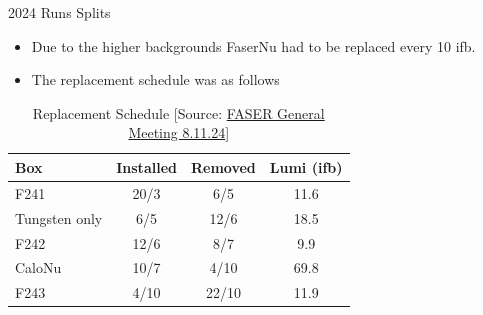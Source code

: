 
\begin{frame}{2024 Runs Splits}
    \begin{itemize}
        \item Due to the higher backgrounds FaserNu had to be replaced every 10 ifb.
        \item The replacement schedule was as follows
    \end{itemize}
    \begin{table}[h!]
        \begin{tabular}{|l|c|c|c|}
            \hline
            \textbf{Box}  & \textbf{Installed} & \textbf{Removed} & \textbf{Lumi (ifb)} \\ \hline
            F241          & 20/3               & 6/5              & 11.6                \\ \hline
            Tungsten only & 6/5                & 12/6             & 18.5                \\ \hline
            F242          & 12/6               & 8/7              & 9.9                 \\ \hline
            CaloNu        & 10/7               & 4/10             & 69.8                \\ \hline
            F243          & 4/10               & 22/10            & 11.9                \\ \hline
        \end{tabular}
        \caption{Replacement Schedule [Source: \href{https://indico.cern.ch/event/1350805/contributions/5686417/attachments/2963344/5212652/FASER-GeneralMtg-8.11.24.pdf}{FASER General Meeting 8.11.24}]}
    \end{table}
\end{frame}

